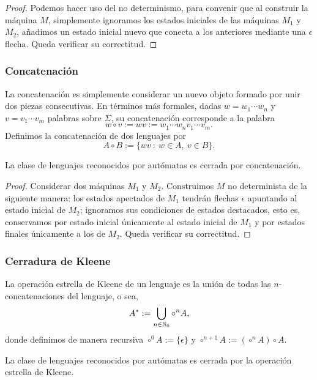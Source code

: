 \begin{proof}
    Podemos hacer uso del no determinismo, para convenir que al construir la m\'aquina \(M\), simplemente ignoramos los estados iniciales de las m\'aquinas \(M_1\) y \(M_2\), a\~nadimos un estado inicial nuevo que conecta a los anteriores mediante una \(\epsilon\) flecha.
    Queda verificar su correctitud.
\end{proof}

\subsubsection{Concatenaci\'on}

La concatenaci\'on es simplemente considerar un nuevo objeto formado por unir dos piezas consecutivas. En t\'erminos m\'as formales, dadas \(w=w_1\cdots w_n\) y \(v=v_1\cdots v_m\) palabras sobre \( \Sigma\), su concatenaci\'on corresponde a la palabra \[w\circ v:= wv:=w_1\cdots w_n v_1 \cdots v_m.\]
Definimos la concatenaci\'on de dos lenguajes por \[A\circ B := \{wv\ : \ w\in A, \ v\in B\}.\]

\begin{proposicion}
    La clase de lenguajes reconocidos por aut\'omatas es cerrada por concatenaci\'on.
\end{proposicion}

\begin{proof}
    Considerar dos m\'aquinas \(M_1\) y \(M_2\). Construimos \(M\) no determinista de la siguiente manera: los estados apectados de \(M_1\) tendr\'an flechas \(\epsilon\) apuntando al estado inicial de \(M_2\); ignoramos sus condiciones de estados destacados, esto es, conservamos por estado inicial \'unicamente al estado inicial de \(M_1\) y por estados finales \'unicamente a los de \(M_2.\) Queda verificar su correctitud.
\end{proof}

\subsubsection{Cerradura de Kleene}

La operaci\'on estrella de Kleene de un lenguaje es la uni\'on de todas las \(n\)-concatenaciones del lenguaje, o sea, \[A^*:=\bigcup_{n\in \mathbb{N}_0} \circ^n A,\] donde definimos de manera recursiva \(\circ^0 A := \{\epsilon\}\) y \(\circ^{n+1}A:=(\circ^n A)\circ A.\)

\begin{proposicion}
    La clase de lenguajes reconocidos por aut\'omatas es cerrada por la operaci\'on estrella de Kleene. 
\end{proposicion}

